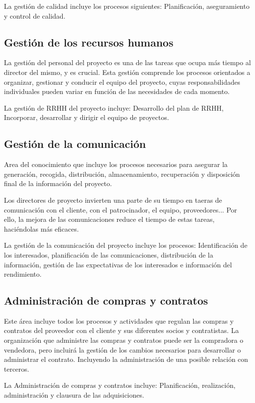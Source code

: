 \documentclass{article}
\begin{document}
La gestión de calidad incluye los procesos siguientes: Planificación, aseguramiento y control de calidad.

\subsection{Gestión de los recursos humanos}
La gestión del personal del proyecto es una de las tareas que ocupa más tiempo al director del mismo, y es crucial. Esta gestión comprende los procesos orientados a organizar, gestionar y conducir el equipo del proyecto, cuyas responsabilidades individuales pueden variar en función de las necesidades de cada momento.

La gestión de RRHH del proyecto incluye: Desarrollo del plan de RRHH, Incorporar, desarrollar y dirigir el equipo de proyectos.

\subsection{Gestión de la comunicación}
Area del conocimiento que incluye los procesos necesarios para asegurar la generación, recogida, distribución, almacenamiento, recuperación y disposición final de la información del proyecto.

Los directores de proyecto invierten una parte de su tiempo en taeras de comunicación con el cliente, con el patrocinador, el equipo, proveedores... Por ello, la mejora de las comunicaciones reduce el tiempo de estas tareas, haciéndolas más eficaces.

La gestión de la comunicación del proyecto incluye los procesos: Identificación de los interesados, planificación de las comunicaciones, distribución de la información, gestión de las expectativas de los interesados e información del rendimiento.

\subsection{Administración de compras y contratos}

Este área incluye todos los procesos y actividades que regulan las compras y contratos del proveedor con el cliente y sus diferentes socios y contratistas. La organización que administre las compras y contratos puede ser la compradora o vendedora, pero incluirá la gestión de los cambios necesarios para desarrollar o administrar el contrato. Incluyendo la administración de una posible relación con terceros.

La Administración de compras y contratos incluye: Planificación, realización, administración y clausura de las adquisiciones.
\end{document}
